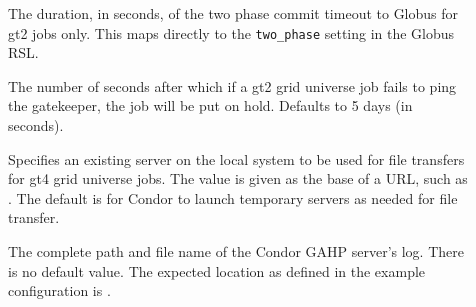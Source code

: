 \begin{description}
\item[]
\label{param:GridmanagerGlobusCommitTimeout}  The duration, in seconds, of the
two phase commit timeout to Globus for gt2 jobs only.  This maps directly to the \texttt{two\_phase} setting in the Globus RSL.



\item[]
\label{param:GlobusGatekeeperTimeout} The number of seconds after
which if a gt2 grid
universe job fails to ping the gatekeeper,
the job will be put on hold.
Defaults to 5 days (in seconds).

\item[]
\label{param:GridftpUrlBase} 
Specifies an existing  server on the local system to be used for
file transfers for gt4 grid universe jobs. The value is given as the base
of a URL, such as . The default is for
Condor to launch temporary  servers as needed for file transfer.

\item[]
\label{param:CGAHPLog} The complete path and file name of the
Condor GAHP server's log.
There is no default value. The expected location as defined
in the example configuration is .


\end{description}
